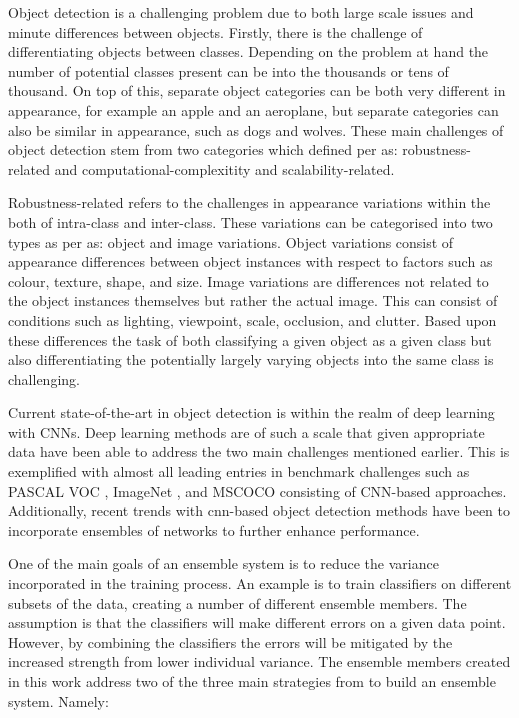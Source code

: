 \documentclass[a4paper,twoside]{article}
\begin{document}
Object detection is a challenging problem due to both large scale issues and minute differences between objects. Firstly, there is the challenge of differentiating objects between classes. Depending on the problem at hand the number of potential classes present can be into the thousands or tens of thousand. On top of this, separate object categories can be both very different in appearance, for example an apple and an aeroplane, but separate categories can also be similar in appearance, such as dogs and wolves. These main challenges of object detection stem from two categories which defined per \cite{zhang} as: robustness-related and computational-complexitity and scalability-related.

Robustness-related refers to the challenges in appearance variations within the both of intra-class and inter-class. These variations can be categorised into two types as per \cite{schroff} as: object and image variations. Object variations consist of appearance differences between object instances with respect to factors such as colour, texture, shape, and size. Image variations are differences not related to the object instances themselves but rather the actual image. This can consist of conditions such as lighting, viewpoint, scale, occlusion, and clutter. Based upon these differences the task of both classifying a given object as a given class but also differentiating the potentially largely varying objects into the same class is challenging.

Current state-of-the-art in object detection is within the realm of deep learning with CNNs. Deep learning methods are of such a scale that given appropriate data have been able to address the two main challenges mentioned earlier. This is exemplified with almost all leading entries in benchmark challenges such as PASCAL VOC \cite{pascalvoc2010}, ImageNet \cite{imagenet}, and MSCOCO \cite{mscoco} consisting of CNN-based approaches. Additionally, recent trends with \gls{cnn}-based object detection methods have been to incorporate ensembles of networks to further enhance performance. 

One of the main goals of an ensemble system is to reduce the variance incorporated in the training process. An example is to train classifiers on different subsets of the data, creating a number of different ensemble members. The assumption is that the classifiers will make different errors on a given data point. However, by combining the classifiers the errors will be mitigated by the increased strength from lower individual variance. The ensemble members created in this work address two of the three main strategies from \cite{ensemblebook} to build an ensemble system. Namely:
\end{document}
